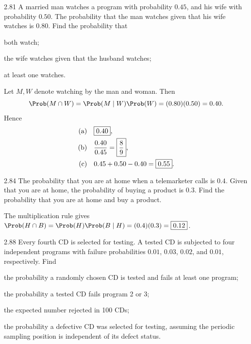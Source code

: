 \documentclass[11pt,oneside]{article}
\begin{document}
\begin{exercise}{2.81}
A married man watches a program with probability $0.45$, and his wife with probability $0.50$. The probability that the man watches given that his wife watches is $0.80$. Find the probability that
\par
\begin{exercisesubparts}
\item both watch;
\item the wife watches given that the husband watches;
\item at least one watches.
\end{exercisesubparts}
\end{exercise}

\begin{solution}
Let $M,W$ denote watching by the man and woman. Then
\[
\Prob(M\cap W)=\Prob(M\mid W)\Prob(W)=(0.80)(0.50)=0.40.
\]
Hence
\begin{align*}
\textup{(a)}\quad&\boxed{0.40},\\
\textup{(b)}\quad&\frac{0.40}{0.45}=\boxed{\frac89},\\
\textup{(c)}\quad&0.45+0.50-0.40=\boxed{0.55}.
\end{align*}
\end{solution}

\begin{exercise}{2.84}
The probability that you are at home when a telemarketer calls is $0.4$. Given that you are at home, the probability of buying a product is $0.3$. Find the probability that you are at home and buy a product.
\end{exercise}

\begin{solution}
The multiplication rule gives $\Prob(H\cap B)=\Prob(H)\Prob(B\mid H)=(0.4)(0.3)=\boxed{0.12}$.
\end{solution}

\begin{exercise}{2.88}
Every fourth CD is selected for testing. A tested CD is subjected to four independent programs with failure probabilities $0.01$, $0.03$, $0.02$, and $0.01$, respectively. Find
\par
\begin{exercisesubparts}
\item the probability a randomly chosen CD is tested and fails at least one program;
\item the probability a tested CD fails program 2 or 3;
\item the expected number rejected in 100 CDs;
\item the probability a defective CD was selected for testing, assuming the periodic sampling position is independent of its defect status.
\end{exercisesubparts}
\end{exercise}
\end{document}
